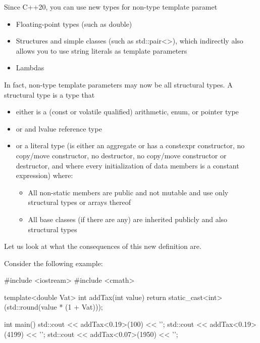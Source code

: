 
Since C++20, you can use new types for non-type template paramet

\begin{itemize}
\item 
Floating-point types (such as double)

\item 
Structures and simple classes (such as std::pair<>), which indirectly also allows you to use string literals as template parameters

\item 
Lambdas
\end{itemize}

In fact, non-type template parameters may now be all structural types. A structural type is a type that

\begin{itemize}
\item 
either is a (const or volatile qualified) arithmetic, enum, or pointer type

\item 
or and lvalue reference type

\item 
or a literal type (is either an aggregate or has a constexpr constructor, no copy/move constructor, no destructor, no copy/move constructor or destructor, and where every initialization of data members is a constant expression) where:

\begin{itemize}
\item 
All non-static members are public and not mutable and use only structural types or arrays thereof

\item 
All base classes (if there are any) are inherited publicly and also structural types
\end{itemize}
\end{itemize}

Let us look at what the consequences of this new definition are.


Consider the following example:


\begin{cpp}
#include <iostream>
#include <cmath>

template<double Vat>
int addTax(int value)
{
	return static_cast<int>(std::round(value * (1 + Vat)));
}

int main()
{
	std::cout << addTax<0.19>(100) << '\n';
	std::cout << addTax<0.19>(4199) << '\n';
	std::cout << addTax<0.07>(1950) << '\n';
}
\end{cpp}

